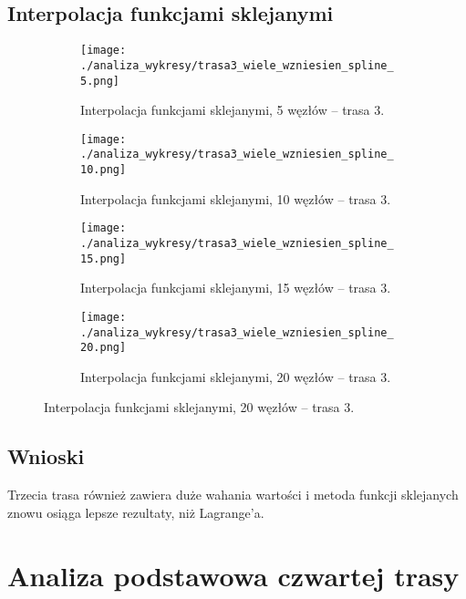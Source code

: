 \documentclass[a4paper,12pt]{article}
\begin{document}
\subsection{Interpolacja funkcjami sklejanymi}
\begin{figure}[H]
    \centering
    \begin{subfigure}{0.45\textwidth}
        \centering
        \texttt{[image: ./analiza\_wykresy/trasa3\_wiele\_wzniesien\_spline\_5.png]}
        \caption{Interpolacja funkcjami sklejanymi, 5 węzłów – trasa 3.}
    \end{subfigure}\hfill
    \begin{subfigure}{0.45\textwidth}
        \centering
        \texttt{[image: ./analiza\_wykresy/trasa3\_wiele\_wzniesien\_spline\_10.png]}
        \caption{Interpolacja funkcjami sklejanymi, 10 węzłów – trasa 3.}
    \end{subfigure}
    
    \vspace{0.5cm}
    
    \begin{subfigure}{0.45\textwidth}
        \centering
        \texttt{[image: ./analiza\_wykresy/trasa3\_wiele\_wzniesien\_spline\_15.png]}
        \caption{Interpolacja funkcjami sklejanymi, 15 węzłów – trasa 3.}
    \end{subfigure}\hfill
    \begin{subfigure}{0.45\textwidth}
        \centering
        \texttt{[image: ./analiza\_wykresy/trasa3\_wiele\_wzniesien\_spline\_20.png]}
        \caption{Interpolacja funkcjami sklejanymi, 20 węzłów – trasa 3.}
    \end{subfigure}
\end{figure}
\subsection{Wnioski}
Trzecia trasa również zawiera duże wahania wartości i metoda funkcji sklejanych znowu osiąga lepsze rezultaty, niż Lagrange'a.

\section{Analiza podstawowa czwartej trasy}
\end{document}
